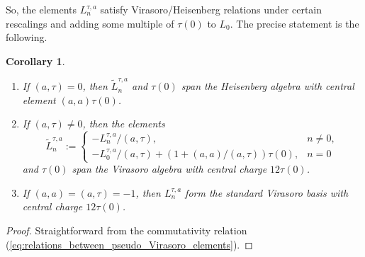 \documentclass[11pt]{amsart}
\numberwithin{equation}{section}
\theoremstyle{plain}
\newtheorem{corollary}[theorem]{Corollary}
\theoremstyle{definition}
\begin{document}
So, the elements $ L_n^{\tau,a}$ satisfy Virasoro/Heisenberg relations under certain rescalings and adding some multiple of $\tau(0)$ to $L_0$. The precise statement is the following.
\begin{corollary}\
    \begin{enumerate}[label=(\roman*)]
        \item If $(a,\tau)=0$, then $\tilde L_n^{\tau,a}$ and $\tau(0)$ span the Heisenberg algebra with central element $(a,a)\tau(0)$.
        \item If $(a,\tau)\ne 0$, then the elements 
        $$
        \tilde L_n^{\tau,a}:=
        \begin{cases}
            -L_n^{\tau,a}/(a,\tau),&n\ne 0,\\
            -L_0^{\tau,a}/(a,\tau)+(1+(a,a)/(a,\tau))\tau(0),&n=0
        \end{cases}
        $$
        and $\tau(0)$ span the Virasoro algebra with central charge $12\tau(0)$.
        \item If $(a,a)=(a,\tau)=-1$, then $L_n^{\tau,a}$ form the standard Virasoro basis with central charge $12\tau(0)$.
    \end{enumerate}
\end{corollary}
\begin{proof}
    Straightforward from the commutativity relation (\ref{eq:relations_between_pseudo_Virasoro_elements}).
\end{proof}
\end{document}
